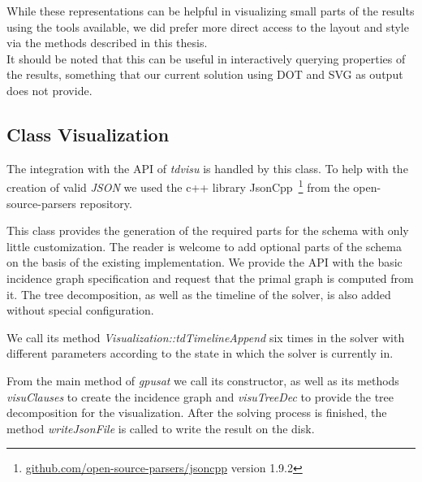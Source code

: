 \documentclass[a4paper, 12pt, bibliography=totoc]{scrartcl}
\begin{document}
While these representations can be helpful in visualizing small parts of the results using the tools available, we did prefer more direct access to the layout and style via the methods described in this thesis.\\
It  should be noted that this can be useful in interactively querying properties of the results, something that our current solution using DOT and SVG as output does not provide.

\subsection{Class Visualization}

The integration with the API of \textit{tdvisu} is handled by this class.
To help with the creation of valid \textit{JSON} we used the c++ library JsonCpp~\footnote{\url{github.com/open-source-parsers/jsoncpp} version 1.9.2}  from the open-source-parsers repository. 

\medskip\noindent
This class provides the generation of the required parts for the schema with only little customization. The reader is welcome to add optional parts of the schema on the basis of the existing implementation.
We provide the API with the basic incidence graph specification and request that the primal graph is computed from it. The tree decomposition, as well as the timeline of the solver, is also added without special configuration.

We call its method \textit{Visualization::tdTimelineAppend} six times in the solver with different parameters according to the state in which the solver is currently in.

From the main method of \textit{gpusat} we call its constructor, as well as its methods \textit{visuClauses} to create the incidence graph and \textit{visuTreeDec} to provide the tree decomposition for the visualization. After the solving process is finished, the method \textit{writeJsonFile} is called to write the result on the disk.

\end{document}
